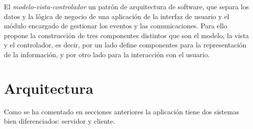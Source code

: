 El \emph{modelo-vista-controlador} un patrón de arquitectura de software, que separa los datos y la lógica de negocio de una aplicación de la interfaz de usuario y el módulo encargado de gestionar los eventos y las comunicaciones. Para ello propone la construcción de tres componentes distintos que son el modelo, la vista y el controlador, es decir, por un lado define componentes para la representación de la información, y por otro lado para la interacción con el usuario.





\section{Arquitectura}\label{arquitectura}

Como se ha comentado en secciones anteriores la aplicación tiene dos sistemas bien diferenciados: servidor y cliente. 

